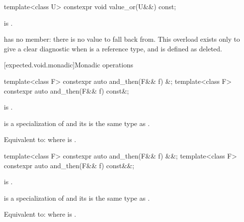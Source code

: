%
\begin{itemdecl}
template<class U> constexpr void value_or(U&&) const;
\end{itemdecl}

\begin{itemdescr}
\pnum
\constraints
{} is .

\pnum
\remarks
{} has no  member: there is no value to fall back from. This overload exists only to give a clear diagnostic when  is a reference type, and is defined as deleted.
\end{itemdescr}

[expected.void.monadic]{Monadic operations}

%
\begin{itemdecl}
template<class F> constexpr auto and_then(F&& f) &;
template<class F> constexpr auto and_then(F&& f) const&;
\end{itemdecl}

\begin{itemdescr}
\pnum
\constraints
{} is .

\pnum
\mandates
{} is a specialization of  and its  is the same type as .

\pnum
\effects
Equivalent to:  where  is .
\end{itemdescr}

%
\begin{itemdecl}
template<class F> constexpr auto and_then(F&& f) &&;
template<class F> constexpr auto and_then(F&& f) const&&;
\end{itemdecl}

\begin{itemdescr}
\pnum
\constraints
{} is .

\pnum
\mandates
{} is a specialization of  and its  is the same type as .

\pnum
\effects
Equivalent to:  where  is .
\end{itemdescr}

